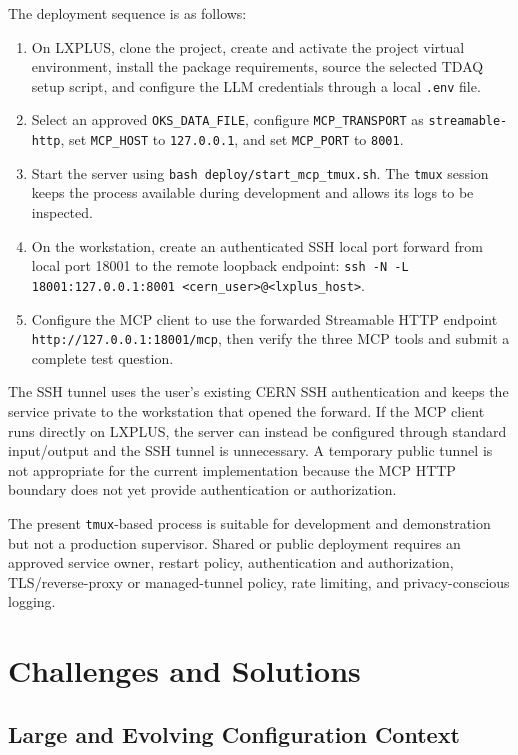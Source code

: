 \documentclass[12pt, a4paper]{report}
\begin{document}
The deployment sequence is as follows:
\begin{enumerate}[label=\arabic*., leftmargin=1cm]
  \item On LXPLUS, clone the project, create and activate the project virtual environment, install the package requirements, source the selected TDAQ setup script, and configure the LLM credentials through a local \texttt{.env} file.
  \item Select an approved \texttt{OKS\_DATA\_FILE}, configure \texttt{MCP\_TRANSPORT} as \texttt{streamable-http}, set \texttt{MCP\_HOST} to \texttt{127.0.0.1}, and set \texttt{MCP\_PORT} to \texttt{8001}.
  \item Start the server using \texttt{bash deploy/start\_mcp\_tmux.sh}. The \texttt{tmux} session keeps the process available during development and allows its logs to be inspected.
  \item On the workstation, create an authenticated SSH local port forward from local port 18001 to the remote loopback endpoint: \texttt{ssh -N -L 18001:127.0.0.1:8001 <cern\_user>@<lxplus\_host>}.
  \item Configure the MCP client to use the forwarded Streamable HTTP endpoint \texttt{http://127.0.0.1:18001/mcp}, then verify the three MCP tools and submit a complete test question.
\end{enumerate}

The SSH tunnel uses the user's existing CERN SSH authentication and keeps the service private to the workstation that opened the forward. If the MCP client runs directly on LXPLUS, the server can instead be configured through standard input/output and the SSH tunnel is unnecessary. A temporary public tunnel is not appropriate for the current implementation because the MCP HTTP boundary does not yet provide authentication or authorization.

The present \texttt{tmux}-based process is suitable for development and demonstration but not a production supervisor. Shared or public deployment requires an approved service owner, restart policy, authentication and authorization, TLS/reverse-proxy or managed-tunnel policy, rate limiting, and privacy-conscious logging.

\section{Challenges and Solutions}

\subsection{Large and Evolving Configuration Context}
\end{document}
